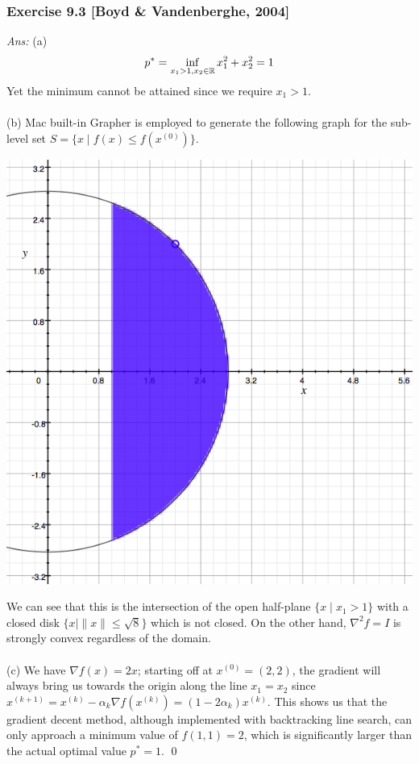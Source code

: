 \documentclass[12pt,a4paper]{article}
\def\R{\ifmmode\mathbb R\fi}
\begin{document}
\subsubsection*{Exercise 9.3 [Boyd \& Vandenberghe, 2004]}
{\it Ans:} (a) 
$$p^\ast = \inf_{x_1 >1, x_2 \in \R} x_1^2 + x_2^2 = 1$$
Yet the minimum cannot be attained since we require $x_1 > 1$. \\
\\
(b) Mac built-in Grapher is employed to generate the following graph for the sub-level set $S = \{x \mid f(x) \leq f(x^{(0)})\}$.
\begin{center}
\includegraphics[scale=0.4]{hw9P93.png}
\end{center}
We can see that this is the intersection of the open half-plane $\{x \mid x_1 > 1\}$ with a closed disk $\{x \mid \|x\| \leq \sqrt{8}\}$ which is not closed. On the other hand, $\nabla^2 f = I$ is strongly convex regardless of the domain. \\
\\
(c) We have $\nabla f(x) = 2x$; starting off at $x^{(0)} = (2, 2)$, the gradient will always bring us towards the origin along the line $x_1 = x_2$ since $x^{(k+1)} = x^{(k)} - \alpha_k \nabla f(x^{(k)}) = (1-2\alpha_k) x^{(k)}$. This shows us that the gradient decent method, although implemented with backtracking line search, can only approach a minimum value of $f(1,1) = 2$, which is significantly larger than the actual optimal value $p^\ast = 1$. \qed
\end{document}
